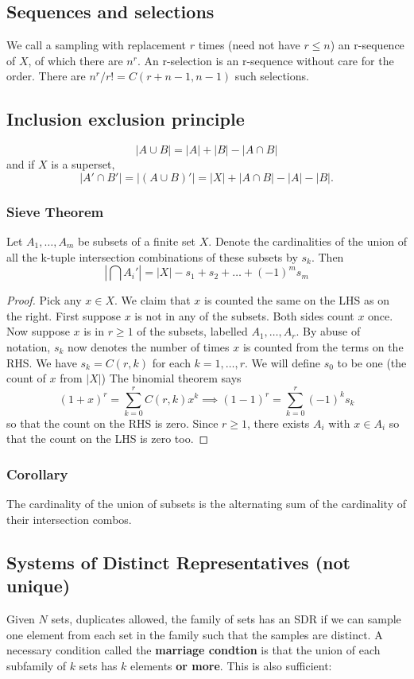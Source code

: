 \subsection{Sequences and selections}
We call a sampling with replacement $r$ times (need not have $r \leq n$) an r-sequence of $X$, of which there are $n^r$. An r-selection is an r-sequence without care for the order.
There are $n^r \slash r! = C(r+n-1,n-1)$ such selections.
\subsection{Inclusion exclusion principle}
$$
|A \cup B| = |A| + |B| - |A \cap B|
$$
and if $X$ is a superset,
$$
|A' \cap B'| = |(A \cup B)'| = |X| + |A \cap B| - |A| - |B|.
$$
\subsubsection{Sieve Theorem}
Let $A_1,\hdots,A_m$ be subsets of a finite set $X$.
Denote the cardinalities of the union of all the k-tuple intersection combinations of these subsets by
$s_k$.
Then $$
|\bigcap A_i'| = |X|-s_1+s_2+\hdots+(-1)^ms_m
$$
\begin{proof}
Pick any $x \in X$. We claim that $x$ is counted the same on the LHS as on the right.
First suppose $x$ is not in any of the subsets. Both sides count $x$ once. Now suppose
$x$ is in $r \geq 1$ of the subsets, labelled $A_1,\hdots,A_r$.
By abuse of notation, $s_k$ now denotes the number of times $x$ is counted from the terms on the RHS.
We have $s_k = C(r,k)$ for each $k=1,\hdots, r$. We will define $s_0$ to be one (the count of $x$ from $|X|$)
The binomial theorem says $$
(1+x)^r = \sum_{k=0}^r C(r,k)x^k \implies (1-1)^r = \sum_{k=0}^r (-1)^k s_k
$$
so that the count on the RHS is zero. Since $r \geq 1$, there exists $A_i$ with $x \in A_i$ so that the count on the LHS is zero too.
\end{proof}
\subsubsection{Corollary}
The cardinality of the union of subsets is the alternating sum of the cardinality of their intersection combos.
\subsection{Systems of Distinct Representatives (not unique)}
Given $N$ sets, duplicates allowed, the family of sets has an SDR if we can sample one element from each set in the family such that
the samples are distinct. A necessary condition called the
\textbf{marriage condtion} is that the union of each subfamily of $k$
sets has $k$ elements \textbf{or more}. This is also sufficient:
